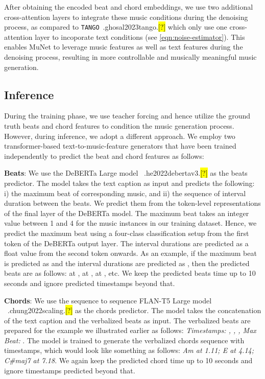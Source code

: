 \documentclass[11pt]{article}
\let\realcite\cite
\renewcommand{\cite}[1]{\ifx.#1.\hl{[?]}\else\realcite{#1}\fi}
\begin{document}
 

After obtaining the encoded beat and chord embeddings, we use two additional cross-attention layers to integrate these music conditions during the denoising process, as compared to \texttt{TANGO}~\cite{ghosal2023tango} which only use one cross-attention layer to incoporate text conditions (see \cref{eqn:noise-estimator}). This enables MuNet to leverage music features as well as text features during the denoising process, resulting in more controllable and musically meaningful music generation.




\subsection{Inference}
During the training phase, we use teacher forcing and hence utilize the ground truth beats and chord features to condition the music generation process. However, during inference, we adopt a different approach. We employ two transformer-based text-to-music-feature generators that have been trained independently to predict the beat and chord features as follows: 


\textbf{Beats}: We use the DeBERTa Large model ~\cite{he2022debertav3} as the beats predictor. The model takes the text caption as input and predicts the following: i) the maximum beat of corresponding music, and ii) the sequence of interval duration between the beats. We predict them from the token-level representations of the final layer of the DeBERTa model. The maximum beat takes an integer value between 1 and 4 for the music instances in our training dataset. Hence, we predict the maximum beat using a four-class classification setup from the first token of the DeBERTa output layer. The interval durations are predicted as a float value from the second token onwards. As an example, if the maximum beat is predicted as  and the interval durations are predicted as , then the predicted beats are as follows:  at ,  at ,  at , etc. We keep the predicted beats time up to 10 seconds and ignore predicted timestamps beyond that. 

\textbf{Chords}: We use the sequence to sequence FLAN-T5 Large model ~\cite{chung2022scaling} as the chords predictor. The model takes the concatenation of the text caption and the verbalized beats as input. The verbalized beats are prepared for the example we illustrated earlier as follows: \textit{Timestamps: , , , Max Beat: }. The model is trained to generate the verbalized chords sequence with timestamps, which would look like something as follows: \textit{Am at 1.11; E at 4.14; C\#maj7 at 7.18}. We again keep the predicted chord time up to 10 seconds and ignore timestamps predicted beyond that. 
\end{document}
